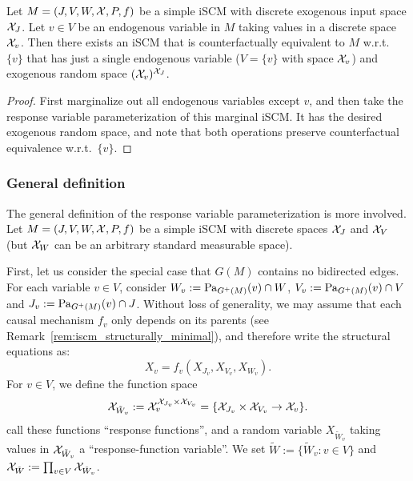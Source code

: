 \begin{Cor}\label{cor:counterfactual_equivalence_response_functions}
  Let $M = \left ( J, V, W, \mathcal{X}, P, f \right )$ be a simple iSCM with discrete exogenous input space $\mathcal{X}_J$.
  Let $v \in V$ be an endogenous variable in $M$ taking values in a discrete space $\mathcal{X}_v$.
  Then there exists an iSCM that is counterfactually equivalent to $M$ w.r.t.\ $\{v\}$ that has
  just a single endogenous variable ($V=\{v\}$ with space $\mathcal{X}_v$) and exogenous random space $(\mathcal{X}_v)^{\mathcal{X}_J}$.
\end{Cor}
\begin{proof}
  First marginalize out all endogenous variables except $v$, and then take the response variable parameterization of this marginal iSCM.
  It has the desired exogenous random space, and note that both operations preserve counterfactual equivalence w.r.t.\ $\{v\}$.
\end{proof}

\subsubsection{General definition}\label{sec:response_functions_general_definition}

The general definition of the response variable parameterization is more involved.
Let $M = \left ( J, V, W, \mathcal{X}, P, f \right )$ be a simple iSCM with discrete spaces $\mathcal{X}_J$ and $\mathcal{X}_V$ (but $\mathcal{X}_W$ can be an arbitrary standard measurable space).

First, let us consider the special case that $G(M)$ contains no bidirected edges.
For each variable $v \in V$, consider $W_v := \mathrm{Pa}_{G^+(M)}(v) \cap W$, $V_v := \mathrm{Pa}_{G^+(M)}(v) \cap V$ and $J_v := \mathrm{Pa}_{G^+(M)}(v) \cap J$.
Without loss of generality, we may assume that each causal mechanism $f_v$ only depends on its parents (see Remark~\ref{rem:iscm_structurally_minimal}), and therefore write the structural equations as:
$$X_v = f_v(X_{J_v},X_{V_v},X_{W_v}).$$ 
For $v \in V$, we define the function space
$$\mathcal{X}_{\tilde{W}_v} := \mathcal{X}_v^{\mathcal{X}_{J_v} \times \mathcal{X}_{V_v}} = \{ \mathcal{X}_{J_v} \times \mathcal{X}_{V_v} \to \mathcal{X}_v \}.$$
\cite{BalkePearl1994b} call these functions ``response functions'', and a random variable $X_{\tilde{W}_v}$ taking values in $\mathcal{X}_{\tilde{W}_v}$ a ``response-function variable''.
We set $\tilde{W} := \{\tilde{W}_v : v \in V\}$ and $\mathcal{X}_{\tilde{W}} := \prod_{v \in V} \mathcal{X}_{\tilde{W}_v}$.

